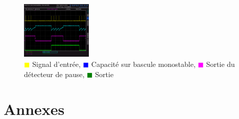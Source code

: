 \documentclass[french]{layout/Report}
\begin{document}
\begin{figure}[h]{}
\centering
\includegraphics[width=0.3\textwidth]{../measurements/SCR12}
\caption{
\textcolor{yellow}{$\blacksquare$} Signal d'entrée,
\textcolor{blue}{$\blacksquare$} Capacité sur bascule monostable,
\textcolor{magenta}{$\blacksquare$} Sortie du détecteur de pause,
\textcolor{green}{$\blacksquare$} Sortie
}
\label{fig:output_signal}
\end{figure}

\section{Annexes}
\end{document}
